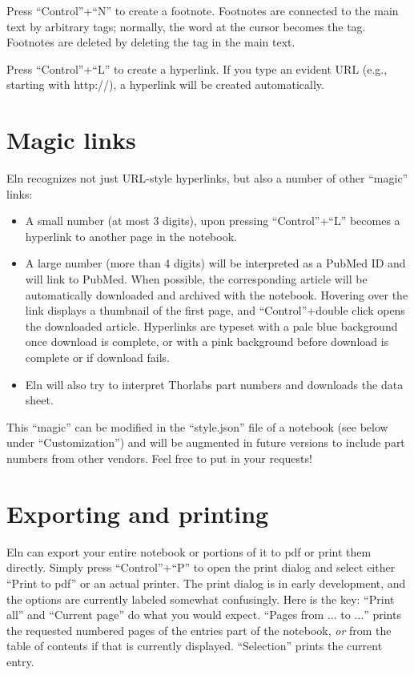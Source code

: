 \documentclass[11pt]{report}
\begin{document}
Press ``Control''+``N'' to create a footnote. Footnotes are connected
to the main text by arbitrary tags; normally, the word at the cursor
becomes the tag. Footnotes are deleted by deleting the tag in the main text.

Press ``Control''+``L'' to create a hyperlink. If you
type an evident URL (e.g., starting with http://), a hyperlink will be
created automatically. 

\section{Magic links}

Eln recognizes not just URL-style hyperlinks, but also a number of
other ``magic'' links:
\begin{itemize}
\item A small number (at most 3 digits), upon pressing ``Control''+``L''
becomes a hyperlink to another page in the notebook.
\item A large number (more than 4 digits)
will be interpreted as a PubMed ID and will link to PubMed. When
possible, the corresponding article will be automatically downloaded
and archived with the notebook. Hovering over the link displays a
thumbnail of the first page, and ``Control''+double click opens the
downloaded article. Hyperlinks are typeset with a pale blue background
once download is complete, or with a pink background before download
is complete or if download fails.
\item Eln will also try to interpret Thorlabs part numbers and
  downloads the data sheet.
\end{itemize}
This ``magic'' can be modified in the ``style.json'' file of a
notebook (see below under ``Customization'') and will be augmented in
future versions to include part numbers from other vendors. Feel free
to put in your requests!

\section{Exporting and printing}

Eln can export your entire notebook or portions of it to pdf or print
them directly. Simply press ``Control''+``P'' to open the print dialog
and select either ``Print to pdf'' or an actual printer. The print
dialog is in early development, and the options are currently labeled
somewhat confusingly. Here is the key: ``Print all'' and ``Current
page'' do what you would expect. ``Pages from $\ldots$ to $\ldots$''
prints the requested numbered pages of the entries part of the
notebook, \emph{or} from the table of contents if that is currently
displayed. ``Selection'' prints the current entry.
\end{document}
